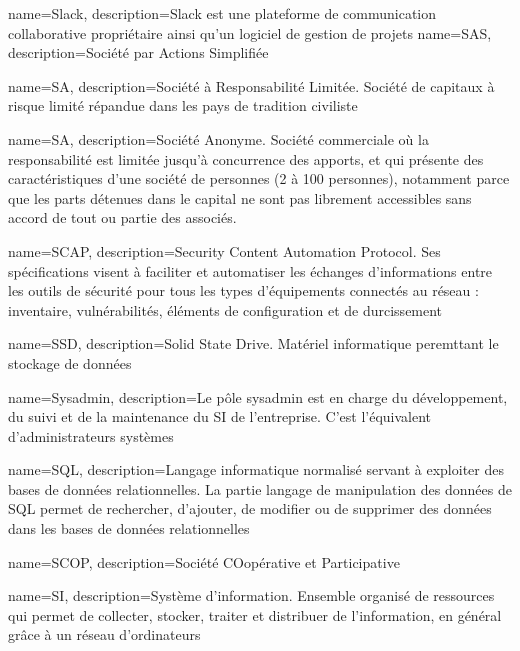 {
    name=Slack,
    description={Slack est une plateforme de communication collaborative propriétaire ainsi qu'un logiciel de gestion de projets}
}
{
    name=SAS,
    description={Société par Actions Simplifiée}
}

{
    name=SA,
    description={Société à Responsabilité Limitée. Société de capitaux à risque limité répandue dans les pays de tradition civiliste}
}

{
    name=SA,
    description={Société Anonyme. Société commerciale où la responsabilité est limitée jusqu'à concurrence des apports, et qui présente des caractéristiques d'une société de personnes (2 à 100 personnes), notamment parce que les parts détenues dans le capital ne sont pas librement accessibles sans accord de tout ou partie des associés. }
}

{
    name=SCAP,
    description={Security Content Automation Protocol. Ses spécifications visent à faciliter et automatiser les échanges d'informations entre les outils de sécurité pour tous les types d'équipements connectés au réseau : inventaire, vulnérabilités, éléments de configuration et de durcissement}
}

{
    name=SSD,
    description={Solid State Drive. Matériel informatique peremttant le stockage de données}
}

{
    name=Sysadmin,
    description={Le pôle sysadmin est en charge du développement, du suivi et de la maintenance du SI de l'entreprise. C'est l'équivalent d'administrateurs systèmes}
}

{
    name=SQL,
    description={Langage informatique normalisé servant à exploiter des bases de données relationnelles. La partie langage de manipulation des données de SQL permet de rechercher, d'ajouter, de modifier ou de supprimer des données dans les bases de données relationnelles}
}

{
    name=SCOP,
    description={Société COopérative et Participative}
}

{
    name=SI,
    description={Système d'information. Ensemble organisé de ressources qui permet de collecter, stocker, traiter et distribuer de l'information, en général grâce à un réseau d'ordinateurs}
}

